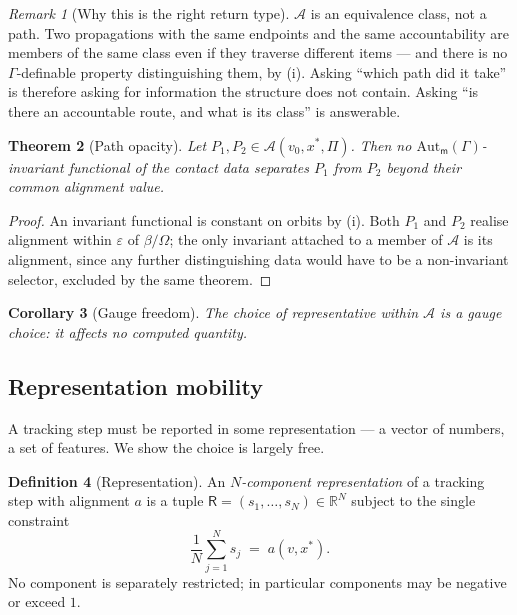 \documentclass[11pt,twocolumn,a4paper]{article}
\theoremstyle{thmstyle}
\newtheorem{theorem}{Theorem}[section]
\newtheorem{corollary}[theorem]{Corollary}
\theoremstyle{definition}
\newtheorem{definition}[theorem]{Definition}
\theoremstyle{remark}
\newtheorem{remark}[theorem]{Remark}
\newcommand{\R}{\mathbb{R}}
\newcommand{\Gph}{\Gamma}
\newcommand{\med}{\mathsf{m}}
\newcommand{\flo}{\beta}
\newcommand{\acc}{\mathcal{A}}
\newcommand{\Rep}{\mathsf{R}}
\newcommand{\Proc}{\Pi}
\newcommand{\eps}{\varepsilon}
\begin{document}
\begin{remark}[Why this is the right return type]
\label{rem:snow}
$\acc$ is an equivalence class, not a path. Two propagations with the
same endpoints and the same accountability are members of the same
class even if they traverse different items --- and there is no
$\Gph$-definable property distinguishing them, by
(i). Asking ``which path did it take'' is therefore
asking for information the structure does not contain. Asking ``is
there an accountable route, and what is its class'' is answerable.
\end{remark}

\begin{theorem}[Path opacity]
\label{thm:path-opacity}
Let $P_1, P_2 \in \acc(v_0, x^{*}, \Proc)$. Then no
$\mathrm{Aut}_\med(\Gph)$-invariant functional of the contact data
separates $P_1$ from $P_2$ beyond their common alignment value.
\end{theorem}

\begin{proof}
An invariant functional is constant on orbits by
(i). Both $P_1$ and $P_2$ realise alignment within
$\eps$ of $\flo/\Omega$; the only invariant attached to a member of
$\acc$ is its alignment, since any further distinguishing data would
have to be a non-invariant selector, excluded by the same theorem.
\end{proof}

\begin{corollary}[Gauge freedom]
\label{cor:gauge}
The choice of representative within $\acc$ is a gauge choice: it
affects no computed quantity.
\end{corollary}

\subsection{Representation mobility}

A tracking step must be reported in some representation --- a vector
of numbers, a set of features. We show the choice is largely free.

\begin{definition}[Representation]
\label{def:representation}
An \emph{$N$-component representation} of a tracking step with
alignment $a$ is a tuple $\Rep = (s_1,\dots,s_N) \in \R^N$ subject to
the single constraint
\begin{equation}
  \frac{1}{N}\sum_{j=1}^{N} s_j \;=\; a(v, x^{*}).
  \label{eq:rep-constraint}
\end{equation}
No component is separately restricted; in particular components may be
negative or exceed $1$.
\end{definition}
\end{document}
